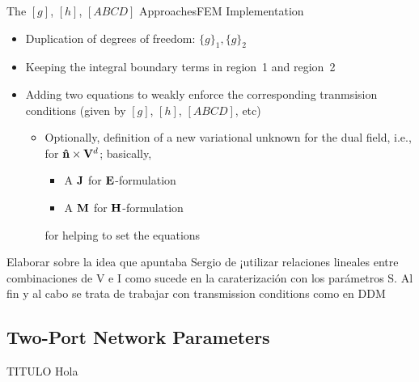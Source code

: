\begin{frame}[allowframebreaks]{The $[g]$, $[h]$, $[ABCD]$
    Approaches}{FEM Implementation}

  \begin{itemize}
  \item Duplication of degrees of freedom:
    $\lbrace g\rbrace_1,\lbrace g\rbrace_2$
  \item Keeping the integral boundary terms in region~1 and region~2

  \item Adding two equations to weakly enforce the corresponding
    tranmsision conditions (given by $[g]$, $[h]$, $[ABCD]$, etc)
    
    \begin{itemize}
    \item  Optionally, definition of a new variational unknown
      for the dual field, i.e., for $\mathbf{\hat{n}}\times\mathbf{V}^d$; basically,
    \begin{itemize}
    \item A $\mathbf{J}$ for $\mathbf{E}$-formulation
    \item A $\mathbf{M}$ for $\mathbf{H}$-formulation
    \end{itemize}
    for helping to set the equations
  \end{itemize}

    
    
  \end{itemize}

  
\end{frame}


  \begin{frame}[plain]
    \centering \Large{Elaborar sobre la idea que apuntaba Sergio de
      ¡utilizar relaciones lineales entre combinaciones de V e I como
      sucede en la caraterización con los parámetros S. Al fin y al
      cabo se trata de trabajar con transmission conditions como en
      DDM}
    
  \end{frame}



\subsection{Two-Port Network Parameters}

\begin{frame}{TITULO}
  Hola
\end{frame}


